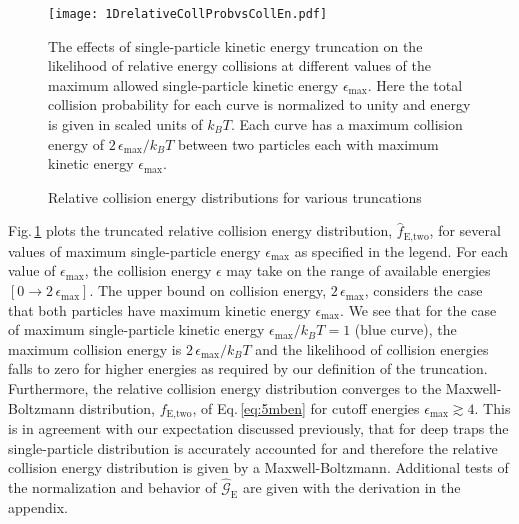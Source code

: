 	\begin{figure} 
	\centerline{
	  \texttt{[image: 1DrelativeCollProbvsCollEn.pdf]}}
	  \caption{Relative collision energy distributions for various truncations}{The effects of single-particle kinetic energy truncation on the likelihood of relative energy collisions at different values of the maximum allowed single-particle kinetic energy $\epsilon_\text{max}$. Here the total collision probability for each curve is normalized to unity and energy is given in scaled units of $k_B T$. Each curve has a maximum collision energy of $2\,\epsilon_\text{max}/k_B T$ between two particles each with maximum kinetic energy $\epsilon_\text{max}$.}
	  \label{fig:relativeCollProb}
	\end{figure}
Fig.\,\ref{fig:relativeCollProb} plots the truncated relative collision energy distribution, $\hat{f}_\text{E,two}$, for several values of maximum single-particle energy $\epsilon_\text{max}$ as specified in the legend.
For each value of $\epsilon_\text{max}$, the collision energy $\epsilon$ may take on the range of available energies $[ 0 \rightarrow 2\,\epsilon_\text{max} ]$.
The upper bound on collision energy, $2\,\epsilon_\text{max}$, considers the case that both particles have maximum kinetic energy $\epsilon_\text{max}$.
We see that for the case of maximum single-particle kinetic energy $\epsilon_\text{max}/k_B T=1$ (blue curve), the maximum collision energy is $2\,\epsilon_\text{max}/k_B T$ and the likelihood of collision energies falls to zero for higher energies as required by our definition of the truncation.
Furthermore, the relative collision energy distribution converges to the Maxwell-Boltzmann distribution, $f_\text{E,two}$, of Eq.\,\ref{eq:5mben} for cutoff energies $\epsilon_\text{max} \gtrsim 4$.
This is in agreement with our expectation discussed previously, that for deep traps the single-particle distribution is accurately accounted for and therefore the relative collision energy distribution is given by a Maxwell-Boltzmann.
Additional tests of the normalization and behavior of $\hat{\mathcal{G}}_\text{E}$ are given with the derivation in the appendix.


